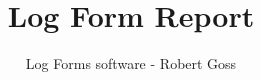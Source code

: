 \documentclass{article}
\begin{document}
\WarningsOff
\ErrorsOff

\title{Log Form Report}
\author{Log Forms software - Robert Goss}


\end{document}
